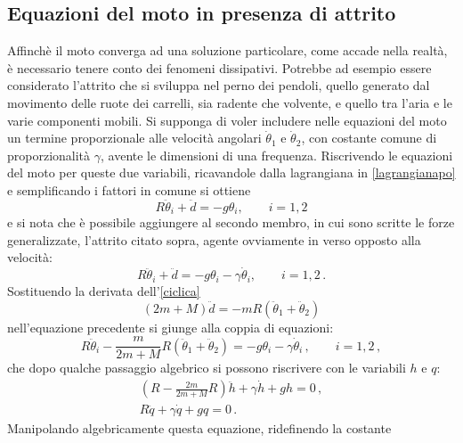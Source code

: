 \documentclass[11pt, a4paper, twoside, italian]{article}
\begin{document}
\subsection{Equazioni del moto in presenza di attrito}
\label{sezioneattrito}
Affinchè il moto converga ad una soluzione particolare, come accade nella realtà, 
è necessario tenere conto dei fenomeni dissipativi.
Potrebbe ad esempio essere considerato l'attrito che si sviluppa nel perno 
dei pendoli, quello generato dal movimento delle ruote dei
 carrelli, sia radente che volvente, e quello tra l'aria e le varie 
 componenti mobili.
Si supponga di voler includere nelle equazioni del moto un termine 
proporzionale alle velocità angolari $\dot \theta_1$ e $\dot \theta_2$, con costante comune di 
proporzionalità $\gamma$, avente le dimensioni di una frequenza. 
Riscrivendo le equazioni del moto 
per queste due variabili, ricavandole dalla lagrangiana in \cref{lagrangianapo} e semplificando i fattori in comune
si ottiene
\begin{equation*}
    R \ddot \theta_i + \ddot d = - g  \theta_i , \qquad i =1,2 
\end{equation*}
e si nota che è possibile aggiungere al secondo membro, in cui sono scritte le 
forze generalizzate, l'attrito citato sopra, agente ovviamente in verso 
opposto alla velocità:
\begin{equation*}
  R \ddot \theta_i + \ddot d = - g \theta_i  - \gamma   \dot \theta_i, \qquad i =1,2 \, .
\end{equation*}
Sostituendo la derivata dell'\cref{ciclica}
\begin{equation*}
  (2m + M) \ddot d = -mR (\ddot \theta_1 + \ddot \theta_2) 
\end{equation*} 
nell'equazione precedente si giunge alla coppia di equazioni:
\begin{equation*}
  R \ddot \theta_i -\frac{m}{2m + M}R (\ddot \theta_1 + \ddot \theta_2) 
  = - g \theta_i  - \gamma   \dot \theta_i \, , \qquad i =1,2 \, ,
\end{equation*}
che dopo qualche passaggio algebrico si possono riscrivere con le variabili
$h$ e $q$:
\begin{equation*}
  \begin{split}
  (R- \frac{2m}{2m + M}R) \ddot h + \gamma \dot h + g h  = 0 \, , \\
  R \ddot q +\gamma \dot q + g q = 0 \, .
  \end{split}
\end{equation*}
Manipolando algebricamente questa equazione, ridefinendo la costante
\end{document}
